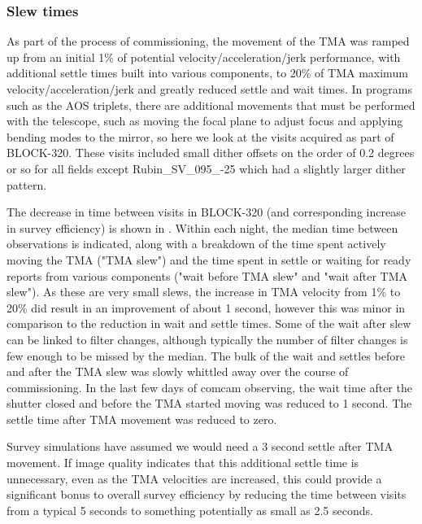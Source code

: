 \subsubsection{Slew times}

As part of the process of commissioning, the movement of the TMA was ramped up from an initial  1\% of potential velocity/acceleration/jerk performance, with additional settle times built into various components, to 20\% of TMA maximum velocity/acceleration/jerk and greatly reduced settle and wait times. In programs such as the AOS triplets, there are additional movements that must be performed with the telescope, such as moving the focal plane to adjust focus and applying bending modes to the mirror, so here we look at the visits acquired as part of BLOCK-320. These visits included small dither offsets on the order of 0.2 degrees or so for all fields except Rubin\_SV\_095\_-25 which had a slightly larger dither pattern. 

The decrease in time between visits in BLOCK-320 (and corresponding increase in survey efficiency) is shown in .  Within each night, the median time between observations is indicated, along with a breakdown of the time spent actively moving the TMA ("TMA slew") and the time spent in settle or waiting for ready reports from various components ("wait before TMA slew" and "wait after TMA slew"). As these are very small slews, the increase in TMA velocity from 1\% to 20\% did result in an improvement of about 1 second, however this was minor in comparison to the reduction in wait and settle times. Some of the wait after slew can be linked to filter changes, although typically the number of filter changes is few enough to be missed by the median. The bulk of the wait and settles before and after the TMA slew was slowly whittled away over the course of commissioning. In the last few days of comcam observing, the wait time after the shutter closed and before the TMA started moving was reduced to 1 second. The settle time after TMA movement was reduced to zero. 

Survey simulations have assumed we would need a 3 second settle after TMA movement. If image quality indicates that this additional settle time is unnecessary, even as the TMA velocities are increased, this could provide a significant bonus to overall survey efficiency by reducing the time between visits from a typical 5 seconds to something potentially as small as 2.5 seconds.


